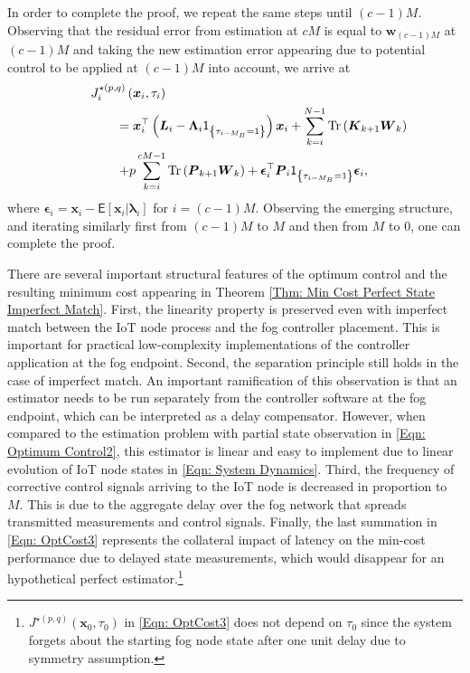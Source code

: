 \documentclass[10pt, journal, letterpaper]{IEEEtran}
\newcommand{\paren}[1]{\left(#1\right)}
\newcommand{\1}{\ensuremath{\mathbf{1}}} %
\newcommand{\I}[1]{\ensuremath{\mathsf{1}_{\left\{#1\right\}}}} %
\newcommand{\ES}[1]{\ensuremath{\mathsf{E}\left[#1 \right]}} %
\newcommand{\mincost}[2]{\ensuremath{J^{\star\paren{#1, #2}}}\paren{\vec{x}_0, \tau_0}}
\newcommand{\mingocost}[3]{\ensuremath{J_{#3}^{\star \paren{#1, #2}}\paren{\vec{x}_{#3}, \tau_{#3}}}}
\renewcommand{\vec}[1]{\ensuremath{\boldsymbol{#1}}} %
\newcommand{\tr}[1]{\ensuremath{{\rm Tr}\left(#1\right)}}
\begin{document}
\begin{IEEEproof}
In order to complete the proof, we repeat the same steps until $(c-1)M$. Observing that the residual error from estimation at $cM$ is equal to $\vec{w}_{(c-1)M}$ at $(c-1)M$ and taking the new estimation error appearing due to potential control to be applied at $(c-1)M$ into account, we arrive at
\begin{eqnarray}
\lefteqn{\mingocost{p}{q}{i}} \hspace{8cm} \nonumber \\
\lefteqn{= \vec{x}_i^\top \paren{\vec{L}_i - \vec{\Lambda}_{i} \I{\tau_{i-M_B}=1}} \vec{x}_i + \sum_{k=i}^{N-1} \tr{\vec{K}_{k+1}\vec{W}_k}} \hspace{7.2cm} \nonumber \\
\lefteqn{+p \sum_{k=i}^{cM-1} \tr{\vec{P}_{k+1} \vec{W}_k} +  \vec{\epsilon}_i^\top \vec{P}_i \I{\tau_{i-M_B}=1} \vec{\epsilon}_i,} \hspace{7.2cm} \nonumber
\end{eqnarray}
where $\vec{\epsilon}_{i} = \vec{x}_{i} - \ES{\vec{x}_{i} \big| \vec{\lambda}_{i}}$ for $i = (c-1)M$. Observing the emerging structure, and iterating similarly first from $(c-1)M$ to $M$ and then from $M$ to $0$, one can complete the proof. \end{IEEEproof}

There are several important structural features of the optimum control and the resulting minimum cost appearing in Theorem \ref{Thm: Min Cost Perfect State Imperfect Match}. First, the linearity property is preserved even with imperfect match between the IoT node process and the fog controller placement. This is important for practical low-complexity implementations of the controller application at the fog endpoint. Second, the separation principle still holds in the case of imperfect match. An important ramification of this observation is that an estimator needs to be run separately from the controller software at the fog endpoint, which can be interpreted as a delay compensator.  However, when compared to the estimation problem with partial state observation in \eqref{Eqn: Optimum Control2}, this estimator is linear and easy to implement due to linear evolution of IoT node states in \eqref{Eqn: System Dynamics}. Third, the frequency of corrective control signals arriving to the IoT node is decreased in proportion to $M$. This is due to the aggregate delay over the fog network that spreads transmitted measurements and control signals. Finally, the last summation in \eqref{Eqn: OptCost3} represents the collateral impact of latency on the min-cost performance due to delayed state measurements, which would disappear for an hypothetical perfect estimator.\footnote{$\mincost{p}{q}$ in \eqref{Eqn: OptCost3} does not depend on $\tau_0$ since the system forgets about the starting fog node state after one unit delay due to symmetry assumption.}
\end{document}
